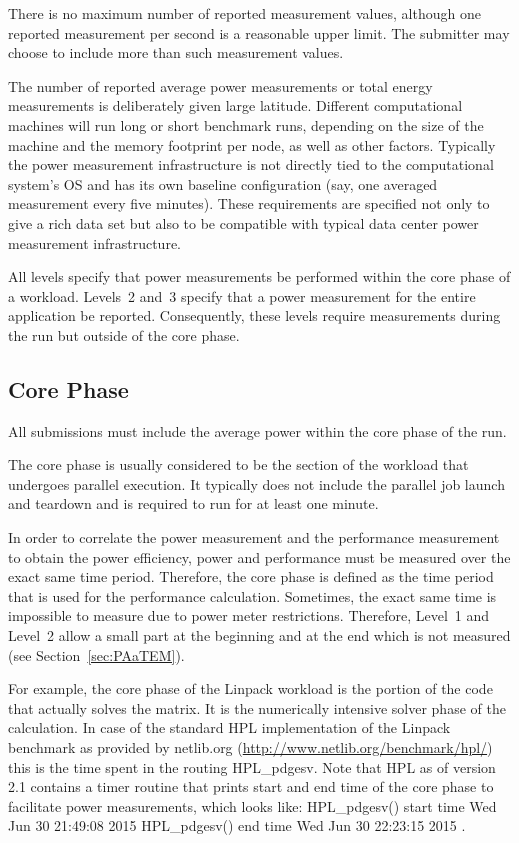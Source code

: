\noindent
There is no maximum number of reported measurement values, although one reported measurement per second is a reasonable upper limit.
The submitter may choose to include more than \MinMeasurementsCorePhaseLTwoThree{} such measurement values.
\wl

\noindent
The number of reported average power measurements or total energy measurements is deliberately given large latitude.
Different computational machines will run long or short benchmark runs, depending on the size of the machine and the memory footprint per node, as well as other factors.
Typically the power measurement infrastructure is not directly tied to the computational system's OS and has its own baseline configuration (say, one averaged measurement every five minutes).
These requirements are specified not only to give a rich data set but also to be compatible with typical data center power measurement infrastructure.
\wl

\noindent
All levels specify that power measurements be performed within the core phase of a workload.
Levels~2 and~3 specify that a power measurement for the entire application be reported.
Consequently, these levels require measurements during the run but outside of the core phase.

\subsection{Core Phase}
\label{sec:core_phase}
\noindent
All submissions must include the average power within the core phase of the run.
\wl

\noindent
The core phase is usually considered to be the section of the workload that undergoes parallel execution.
It typically does not include the parallel job launch and teardown and is required to run for at least one minute.
\wl

\noindent
In order to correlate the power measurement and the performance measurement to obtain the power efficiency, power and performance must be measured over the exact same time period.
Therefore, the core phase is defined as the time period that is used for the performance calculation.
Sometimes, the exact same time is impossible to measure due to power meter restrictions.
Therefore, Level~1 and Level~2 allow a small part at the beginning and at the end which is not measured (see Section~\ref{sec:PAaTEM}).
\wl

\noindent
For example, the core phase of the Linpack workload is the portion of the code that actually solves the matrix.
It is the numerically intensive solver phase of the calculation.
In case of the standard HPL implementation of the Linpack benchmark as provided by netlib.org (\url{http://www.netlib.org/benchmark/hpl/}) this is the time spent in the routing {\ttfamily HPL\_pdgesv}.
Note that HPL as of version 2.1 contains a timer routine that prints start and end time of the core phase to facilitate power measurements, which looks like:\newline
{\ttfamily
HPL\_pdgesv() start time Wed Jun 30 21:49:08 2015\newline
HPL\_pdgesv() end time Wed Jun 30 22:23:15 2015
}.

